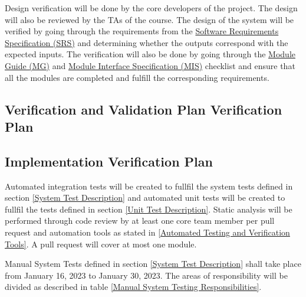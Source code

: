 \documentclass[12pt, titlepage]{article}
\begin{document}
Design verification will be done by the core developers of the project. The design will also be
reviewed by the TAs of the course. The design of the system will be verified by going through the
requirements from the
\href{https://github.com/arkinmodi/project-sayyara/blob/main/docs/SRS/SRS.pdf}{Software
	Requirements Specification (SRS)} and determining whether the outputs correspond with the expected
inputs. The verification will also be done by going through the
\href{https://github.com/arkinmodi/project-sayyara/blob/main/docs/Design/MG/MG.pdf}{Module Guide
	(MG)} and
\href{https://github.com/arkinmodi/project-sayyara/blob/main/docs/Design/MIS/MIS.pdf}{Module
	Interface Specification (MIS)} checklist and ensure that all the modules are completed and fulfill
the corresponding requirements.

\subsection{Verification and Validation Plan Verification Plan}




\subsection{Implementation Verification Plan}

Automated integration tests will be created to fullfil the system tests defined in section
\ref{System Test Description} and automated unit tests will be created to fullfil the tests defined
in section \ref{Unit Test Description}. Static analysis will be performed through code review by at
least one core team member per pull request and automation tools as stated in \ref{Automated
	Testing and Verification Tools}. A pull request will cover at most one module.

Manual System Tests defined in section \ref{System Test Description} shall take place from January
16, 2023 to January 30, 2023. The areas of responsibility will be divided as described in table
\ref{Manual System Testing Responsibilities}.
\end{document}

